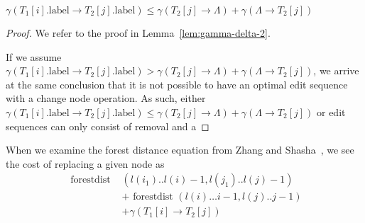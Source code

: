 


\begin{lemma}
    $\gamma\left(T_1[i].\text{label} \rightarrow T_2[j].\text{label}\right) \le \gamma(T_2[j] \rightarrow {\Lambda}) + \gamma(\Lambda \rightarrow {T_2[j]})$

    \begin{proof}
        We refer to the proof in Lemma~\ref{lem:gamma-delta-2}. 
        
        If we assume $\gamma\left(T_1[i].\text{label} \rightarrow T_2[j].\text{label}\right) > \gamma(T_2[j] \rightarrow {\Lambda}) + \gamma(\Lambda \rightarrow {T_2[j]})$, we arrive at the same conclusion that it is not possible to have an optimal edit sequence with a change node operation. As such, either $\gamma\left(T_1[i].\text{label} \rightarrow T_2[j].\text{label}\right) \le \gamma(T_2[j] \rightarrow {\Lambda}) + \gamma(\Lambda \rightarrow {T_2[j]})$ or edit sequences can only consist of removal and a
    \end{proof}
\end{lemma}



When we examine the forest distance equation from Zhang and Shasha~\cite{zhang_simple_1989}, we see the cost of replacing a given node as
\begin{align*}
    \text { forestdist } & \left(l\left(i_1\right) . . l(i)-1, l\left(j_1\right) . . l(j)-1\right) \\
                         & + \text { forestdist }(l(i) \ldots i-1, l(j) . . j-1)                   \\
                         & + \gamma\left(T_1[i] \rightarrow T_2[j]\right)
\end{align*}


